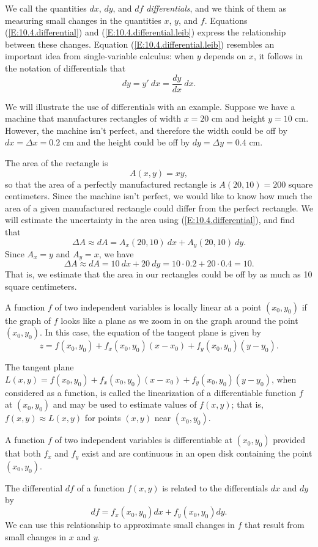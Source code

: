 We call the quantities $dx$, $dy$, and $df$ {\em differentials}, and
we think of them as measuring small changes in the quantities $x$,
$y$, and $f$.  Equations (\ref{E:10.4.differential}) 
and (\ref{E:10.4.differential.leib}) express the
relationship between these changes.  Equation
(\ref{E:10.4.differential.leib}) resembles an important idea 
from single-variable calculus:  when $y$ depends on $x$,
it follows in the notation of differentials that 
$$
dy = y'~dx = \frac{dy}{dx}~dx.
$$

We will illustrate the use of differentials with an
example.  Suppose we have a machine that manufactures rectangles of
width $x=20$ cm and height $y=10$ cm.  However, the machine isn't
perfect, and therefore the width could be off by $dx = \Delta x = 0.2$ cm and
the height could be off by $dy = \Delta y = 0.4$ cm.  

The area of the rectangle is 
$$
A(x,y) = xy,
$$
so that the area of a perfectly manufactured rectangle is $A(20, 10) =
200$ square centimeters.  Since the machine isn't perfect, we would
like to know how much the area of a given manufactured rectangle could differ from the
perfect rectangle.  We will estimate the uncertainty in the area using
(\ref{E:10.4.differential}), and find that
$$
\Delta A \approx dA = A_x(20, 10)~dx + A_y(20,10)~dy.
$$
Since $A_x = y$ and $A_y = x$, we have
$$
\Delta A \approx dA = 10~dx + 20~dy = 10\cdot0.2 + 20\cdot0.4 = 10.
$$
That is, we estimate that the area in our rectangles could be off by
as much as 10 square centimeters.





\begin{summary}
\item A function $f$ of two independent variables is locally linear at
  a point $(x_0,y_0)$ if the graph of $f$ looks like a plane 
  as we zoom in on the graph around the point $(x_0,y_0)$.  In this
  case, the equation of the tangent plane is given by
  $$
  z = f(x_0,y_0) + f_x(x_0,y_0)(x-x_0) + f_y(x_0,y_0)(y-y_0).
  $$
\item The tangent plane $L(x,y) = f(x_0,y_0) + f_x(x_0,y_0)(x-x_0) + f_y(x_0,y_0)(y-y_0)$, when considered as a function, is
  called the linearization of a differentiable function $f$ at $(x_0,y_0)$ and may be used
  to estimate values of $f(x,y)$;  that is, $f(x,y) \approx L(x,y)$
  for points $(x,y)$ near $(x_0,y_0)$.
  
\item A function $f$ of two independent variables is differentiable at $(x_0,y_0)$ provided that both $f_x$ and $f_y$ exist and are continuous in an open disk containing 
the point $(x_0,y_0)$.

\item The differential $df$ of a function $f(x,y)$ is related to the
  differentials $dx$ and $dy$ by
  \[df = f_x(x_0,y_0) dx + f_y(x_0,y_0)dy.\] 
  We can use this relationship to
  approximate small changes in $f$ that result from small changes in
  $x$ and $y$.
\end{summary}


\nin \hrulefill



\clearpage

